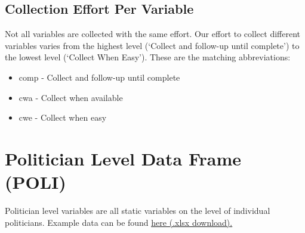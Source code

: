 \documentclass{article}
\begin{document}
\subsection{Collection Effort Per Variable}
Not all variables are collected with the same effort. Our effort to collect different variables varies from the highest level (`Collect and follow-up until \gls{comp}lete') to the lowest level (`Collect When Easy'). These are the matching abbreviations:
\begin{itemize}
    \item \gls{comp} - Collect and follow-up until complete
    \item \gls{cwa} - Collect when available
    \item \gls{cwe} - Collect when easy
\end{itemize}

\newpage

\section{Politician Level Data Frame (\gls{POLI})}\label{POLI} 
Politician level variables are all static variables on the level of individual politicians. Example data can be found \href{http://parliamentarycareersincomparison.org/wp-content/uploads/2017/03/DF.xlsx}{\underline{here} (.xlsx download).}

\end{document}
